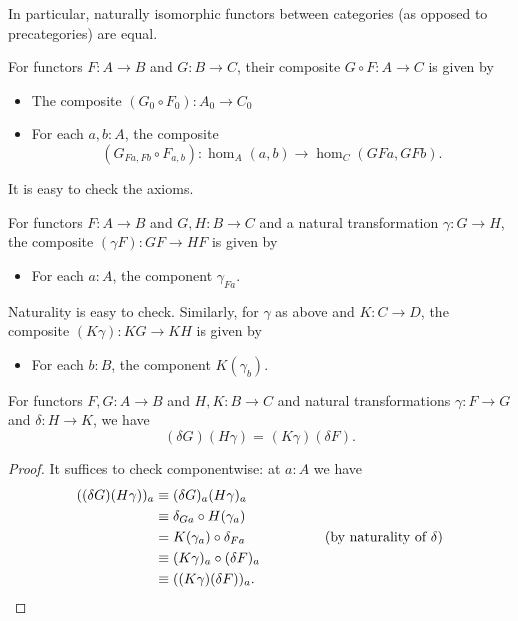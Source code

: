 \documentclass{amsart}
\newcommand{\jdeq}{\equiv}      %
\newcommand{\id}[3][]{\ensuremath{#2 =_{#1} #3}\xspace}
\theoremstyle{definition}
\theoremstyle{remark}
\numberwithin{equation}{section}
\begin{document}
In particular, naturally isomorphic functors between categories (as opposed to precategories) are equal.


\begin{defn}
  For functors $F:A\to B$ and $G:B\to C$, their composite $G\circ F:A\to C$ is given by
  \begin{itemize}
  \item The composite $(G_0\circ F_0) : A_0 \to C_0$
  \item For each $a,b:A$, the composite
    \[(G_{Fa,Fb}\circ F_{a,b}):\hom_A(a,b) \to \hom_C(GFa,GFb).\]
  \end{itemize}
  It is easy to check the axioms.
\end{defn}

\begin{defn}\label{def:whisker}
  For functors $F:A\to B$ and $G,H:B\to C$ and a natural transformation $\gamma:G\to H$, the composite $(\gamma F):GF\to HF$ is given by
  \begin{itemize}
  \item For each $a:A$, the component $\gamma_{Fa}$.
  \end{itemize}
  Naturality is easy to check.
  Similarly, for $\gamma$ as above and $K:C\to D$, the composite $(K\gamma):KG\to KH$ is given by
  \begin{itemize}
  \item For each $b:B$, the component $K(\gamma_b)$.
  \end{itemize}
\end{defn}

\begin{lem}\label{ct:interchange}
  For functors $F,G:A\to B$ and $H,K:B\to C$ and natural transformations $\gamma:F\to G$ and $\delta:H\to K$, we have
  \[\id{(\delta G)(H\gamma)}{(K\gamma)(\delta F)}.\]
\end{lem}
\begin{proof}
  It suffices to check componentwise: at $a:A$ we have
  \begin{align*}
    ((\delta G)(H\gamma))_a
    &\jdeq (\delta G)_{a}(H\gamma)_a\\
    &\jdeq \delta_{Ga}\circ H(\gamma_a)\\
    &= K(\gamma_a) \circ \delta_{Fa} \hspace{2cm}\text{(by naturality of $\delta$)}\\
    &\jdeq (K \gamma)_a\circ (\delta F)_a\\
    &\jdeq ((K \gamma)(\delta F))_a.\qedhere
  \end{align*}
\end{proof}
\end{document}
